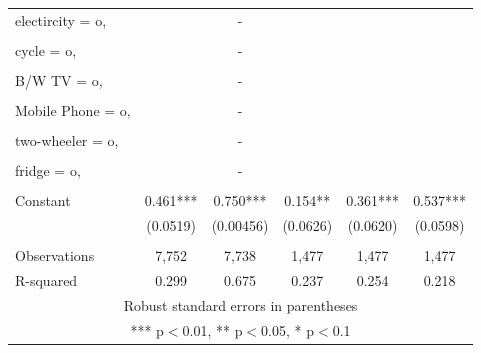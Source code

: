 \documentclass[]{article}
\begin{document}
\begin{tabular}{lccccc}
electircity = o, &  & - &  &  &  \\
 &  &  &  &  &  \\
cycle = o, &  & - &  &  &  \\
 &  &  &  &  &  \\
B/W TV = o, &  & - &  &  &  \\
 &  &  &  &  &  \\
Mobile Phone = o, &  & - &  &  &  \\
 &  &  &  &  &  \\
two-wheeler = o, &  & - &  &  &  \\
 &  &  &  &  &  \\
fridge = o, &  & - &  &  &  \\
 &  &  &  &  &  \\
Constant & 0.461*** & 0.750*** & 0.154** & 0.361*** & 0.537*** \\
 & (0.0519) & (0.00456) & (0.0626) & (0.0620) & (0.0598) \\
 &  &  &  &  &  \\
Observations & 7,752 & 7,738 & 1,477 & 1,477 & 1,477 \\
 R-squared & 0.299 & 0.675 & 0.237 & 0.254 & 0.218 \\ \hline
\multicolumn{6}{c}{ Robust standard errors in parentheses} \\
\multicolumn{6}{c}{ *** p$<$0.01, ** p$<$0.05, * p$<$0.1} \\
\end{tabular}
\end{document}
